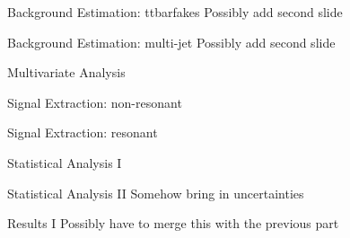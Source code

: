 \documentclass[11pt, xcolor={dvipsnames}, aspectratio=169]{beamer}
\begin{document}

\begin{frame}{Background Estimation: ttbarfakes}
  Possibly add second slide
\end{frame}


\begin{frame}{Background Estimation: multi-jet}
  Possibly add second slide
\end{frame}


\begin{frame}{Multivariate Analysis}
\end{frame}


\begin{frame}{Signal Extraction: non-resonant}
\end{frame}


\begin{frame}{Signal Extraction: resonant}
\end{frame}


\begin{frame}{Statistical Analysis I}
\end{frame}


\begin{frame}{Statistical Analysis II}
  Somehow bring in uncertainties
\end{frame}


\begin{frame}{Results I}
  Possibly have to merge this with the previous part
\end{frame}

\end{document}
